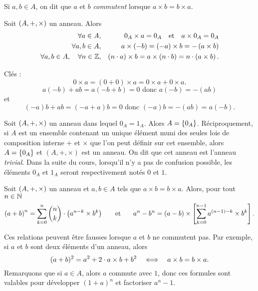 \documentclass{magnolia}
\begin{document}
\begin{remarqueUnique}
\remarque Si $a,b\in A$, on dit que $a$ et $b$ \emph{commutent} lorsque $a\times b=b\times a$.
\end{remarqueUnique}



\begin{proposition}
Soit $\left(A,+,\times\right)$ un anneau. Alors
\begin{eqnarray*}
\forall a\in A, & & 0_A \times a=0_A \quad\text{et}\quad a \times 0_A = 0_A\\
\forall a,b\in A, & & a\times\left(-b\right)=\left(-a\right)\times b=-\left(a\times b\right)\\
\forall a,b\in A ,\quad \forall n\in\mathbb{Z}, & &
  \left(n\cdot a\right)\times b=a\times\left(n\cdot b\right)=n\cdot\left(a\times b\right).
\end{eqnarray*}
\end{proposition}

\begin{preuve}
Clés : 
$$0\times a=(0+0)\times a=0\times a + 0\times a.$$
$$a(-b)+ab=a(-b+b)=0 \text{ donc } a(-b)=-(ab)$$
et $$(-a)b+ab=(-a+a)b=0 \text{ donc } (-a)b=-(ab)=a(-b).$$
\end{preuve}

\begin{remarques}
\remarque Soit $\left(A,+,\times\right)$ un anneau dans lequel $0_A=1_A$. Alors $A=\left\{0_A\right\}$. Réciproquement, si $A$ est un ensemble contenant un unique élément muni des seules lois de composition interne $+$ et $\times$ que l'on peut définir sur cet ensemble, alors $A=\left\{0_A\right\}$ et $(A,+,\times)$ est un anneau. On dit que cet anneau est l'anneau \emph{trivial}.
\remarque Dans la suite du cours, lorsqu'il n'y a pas de confusion possible,
  les éléments $0_A$ et $1_A$ seront respectivement notés $0$ et $1$.
\end{remarques}

\begin{proposition}
Soit $\left(A,+,\times\right)$ un anneau et $a,b\in A$ tels que $a\times b=b\times a$.
Alors, pour tout $n\in\mathbb{N}$
\[\left(a+b\right)^n = \sum_{k=0}^n \binom{n}{k} \cdot \left(a^{n-k} \times b^k\right) \quad\quad\!\text{et}\quad\!\quad
  a^n-b^n=\left(a-b\right)\times\left[\sum_{k=0}^{n-1} a^{\left(n-1\right)-k}\times b^k\right].\]
\end{proposition}

\begin{remarques}
\remarque Ces relations peuvent être fausses lorsque $a$ et $b$ ne commutent
  pas. Par exemple, si $a$ et $b$ sont deux éléments d'un anneau, alors
  \[(a+b)^2=a^2+2\cdot a\times b+b^2 \quad\Longleftrightarrow\quad a\times b=b\times a.\]
\remarque Remarquons que si $a\in A$, alors $a$ commute
  avec $1$, donc ces formules sont valables pour développer $(1+a)^n$ et
  factoriser $a^n-1$.
\end{remarques}
\end{document}
